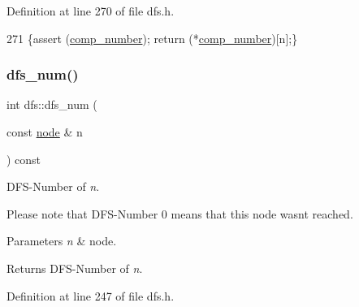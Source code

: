 Definition at line 270 of file dfs.\+h.


\begin{DoxyCode}
271     \{assert (\mbox{\hyperlink{classdfs_a00db016ac7eab69045cae408008890c1}{comp\_number}}); \textcolor{keywordflow}{return} (*\mbox{\hyperlink{classdfs_a00db016ac7eab69045cae408008890c1}{comp\_number}})[n];\}
\end{DoxyCode}
\mbox{\label{classdfs_a315f16831a0bd333960e87e045cb37c8}} 
\subsubsection{\texorpdfstring{dfs\+\_\+num()}{dfs\_num()}}
{\footnotesize\ttfamily int dfs\+::dfs\+\_\+num (\begin{DoxyParamCaption}\item[{const \mbox{\hyperlink{classnode}{node}} \&}]{n }\end{DoxyParamCaption}) const\hspace{0.3cm}{\ttfamily [inline]}}



D\+F\+S-\/\+Number of {\itshape n}. 

Please note that D\+F\+S-\/\+Number 0 means that this node wasn\textquotesingle{}t reached.


\begin{DoxyParams}{Parameters}
{\em n} & node. \\
\hline
\end{DoxyParams}
\begin{DoxyReturn}{Returns}
D\+F\+S-\/\+Number of {\itshape n}. 
\end{DoxyReturn}


Definition at line 247 of file dfs.\+h.


